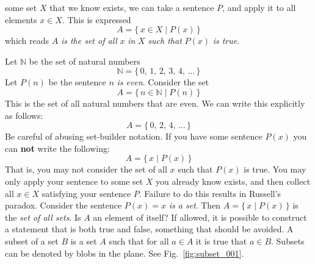 \documentclass{article}
\theoremstyle{plain}
\theoremstyle{normal}
\newenvironment{example}{%
    \pushQED{\qed}\renewcommand{\qedsymbol}{$\blacksquare$}\examplex%
}{%
    \popQED\endexamplex%
}
\newenvironment{definition}{%
    \pushQED{\qed}\renewcommand{\qedsymbol}{$\blacksquare$}\definitionx%
}{%
    \popQED\enddefinitionx%
}
\begin{document}
        some set $X$ that we know exists, we can take a sentence $P$, and
        apply it to all elements $x\in{X}$.
        This is expressed
        \begin{equation}
            A=\{\,x\in{X}\;|\;P(x)\,\}
        \end{equation}
        which reads $A$ \textit{is the set of all} $x$ \textit{in} $X$
        \textit{such that} $P(x)$ \textit{is true}.
        \begin{example}
            Let $\mathbb{N}$ be the set of natural numbers
            \begin{equation}
                \mathbb{N}=\{\,0,\,1,\,2,\,3,\,4,\,\dots\,\}
            \end{equation}
            Let $P(n)$ be the sentence $n$ \textit{is even}. Consider the
            set
            \begin{equation}
                A=\{\,n\in\mathbb{N}\;|\;P(n)\,\}
            \end{equation}
            This is the set of all natural numbers that are even. We can write
            this explicitly as follows:
            \begin{equation}
                A=\{\,0,\,2,\,4,\,\dots\,\}
            \end{equation}
        \end{example}
        Be careful of abusing set-builder notation. If you have some sentence
        $P(x)$ you can \textbf{not} write the following:
        \begin{equation}
            A=\{\,x\;|\;P(x)\,\}
        \end{equation}
        That is, you may not consider the set of all $x$ such that $P(x)$ is
        true. You may only apply your sentence to some set $X$ you already
        know exists, and then collect all $x\in{X}$ satisfying your sentence
        $P$. Failure to do this results in Russell's paradox. Consider the
        sentence $P(x)=x$ \textit{is a set}. Then
        $A=\{\,x\;|\;P(x)\,\}$ is the \textit{set of all sets}. Is
        $A$ an element of itself? If allowed, it is possible to construct
        a statement that is both true and false, something that should be
        avoided.
        \begin{definition}[\textbf{Subset}]
            A subset of a set $B$ is a set $A$ such that for all $a\in{A}$
            it is true that $a\in{B}$.
        \end{definition}
        Subsets can be denoted by blobs in the plane. See
        Fig.~\ref{fig:subset_001}.
\end{document}
